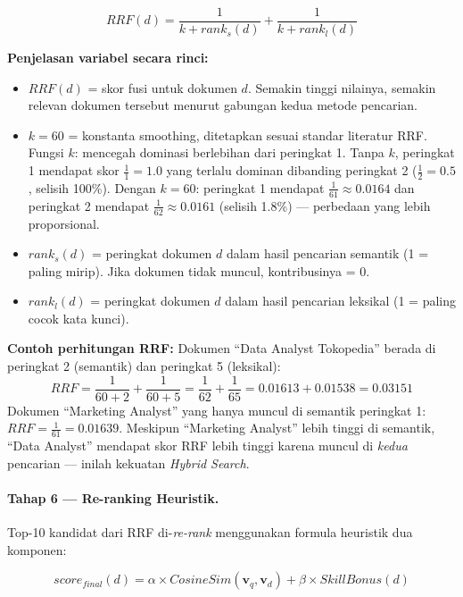 \begin{equation}
  RRF(d) = \frac{1}{k + rank_s(d)} + \frac{1}{k + rank_l(d)}
  \label{eq:rrf_bab3}
\end{equation}

\noindent \textbf{Penjelasan variabel secara rinci:}
\begin{itemize}
  \item $RRF(d)$ = skor fusi untuk dokumen $d$. Semakin tinggi nilainya, semakin
    relevan dokumen tersebut menurut gabungan kedua metode pencarian.
  \item $k = 60$ = konstanta smoothing, ditetapkan sesuai standar literatur RRF.
    Fungsi $k$: mencegah dominasi berlebihan dari peringkat 1. Tanpa $k$, peringkat 1
    mendapat skor $\frac{1}{1} = 1.0$ yang terlalu dominan dibanding peringkat 2
    ($\frac{1}{2} = 0.5$, selisih 100\%). Dengan $k = 60$: peringkat 1 mendapat
    $\frac{1}{61} \approx 0.0164$ dan peringkat 2 mendapat $\frac{1}{62} \approx 0.0161$
    (selisih 1.8\%) --- perbedaan yang lebih proporsional.
  \item $rank_s(d)$ = peringkat dokumen $d$ dalam hasil pencarian semantik
    (1 = paling mirip). Jika dokumen tidak muncul, kontribusinya = 0.
  \item $rank_l(d)$ = peringkat dokumen $d$ dalam hasil pencarian leksikal
    (1 = paling cocok kata kunci).
\end{itemize}

\textbf{Contoh perhitungan RRF:} Dokumen ``Data Analyst Tokopedia'' berada di
peringkat 2 (semantik) dan peringkat 5 (leksikal):
\[
  RRF = \frac{1}{60+2} + \frac{1}{60+5} = \frac{1}{62} + \frac{1}{65}
  = 0.01613 + 0.01538 = 0.03151
\]
Dokumen ``Marketing Analyst'' yang hanya muncul di semantik peringkat 1:
$RRF = \frac{1}{61} = 0.01639$.
Meskipun ``Marketing Analyst'' lebih tinggi di semantik, ``Data Analyst'' mendapat
skor RRF lebih tinggi karena muncul di \textit{kedua} pencarian --- inilah kekuatan
\textit{Hybrid Search}.

\paragraph{Tahap 6 --- Re-ranking Heuristik.}
Top-10 kandidat dari RRF di-\textit{re-rank} menggunakan formula heuristik dua komponen:

\begin{equation}
  score_{final}(d) = \alpha \times CosineSim(\mathbf{v}_q, \mathbf{v}_d)
  + \beta \times SkillBonus(d)
  \label{eq:rerank}
\end{equation}

